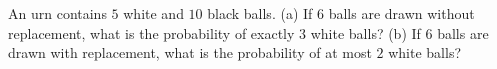 An urn contains $5$ white and $10$ black balls. (a) If $6$ balls are drawn without replacement, what is the probability of exactly $3$ white balls? (b) If $6$ balls are drawn with replacement, what is the probability of at most $2$ white balls?
